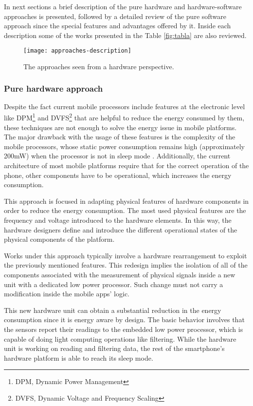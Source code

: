 In next sections a brief description of the pure hardware and hardware-software approaches is presented, followed by a detailed review of the pure software approach since the special features and advantages offered by it.
Inside each description some of the works presented in the Table \ref{fig:tabla} are also reviewed.

\begin{figure}
\centering
\texttt{[image: approaches-description]}
\caption[Approaches seen from hardware perspective]{The approaches seen from a hardware perspective.}
\label{fig:approaches-description}
\end{figure}

\subsubsection{Pure hardware approach}

Despite the fact current mobile processors include features at the electronic level like DPM\footnote{DPM, Dynamic Power Management} and DVFS\footnote{DVFS, Dynamic Voltage and Frequency Scaling} that are helpful to reduce the energy consumed by them, these techniques are not enough to solve the energy issue in mobile platforms.
The major drawback with the usage of these features is the complexity of the mobile processors, whose static power consumption remains high (approximately 200mW) when the processor is not in sleep mode \cite{Priyantha2011}.
Additionally, the current architecture of most mobile platforms require that for the correct operation of the phone, other components have to be operational, which increases the energy consumption.

This approach is focused in adapting physical features of hardware components in order to reduce the energy consumption.
The most used physical features are the frequency and voltage introduced to the hardware elements.
In this way, the hardware designers define and introduce the different operational states of the physical components of the platform.

Works under this approach typically involve a hardware rearrangement to exploit the previously mentioned features.
This redesign implies the isolation of all of the components associated with the measurement of physical signals inside a new unit with a dedicated low power processor.
Such change must not carry a modification inside the mobile apps' logic.

This new hardware unit can obtain a substantial reduction in the energy consumption since it is energy aware by design.
The basic behavior involves that the sensors report their readings to the embedded low power processor, which is capable of doing light computing operations like filtering.
While the hardware unit is working on reading and filtering data, the rest of the smartphone's hardware platform is able to reach its sleep mode.

